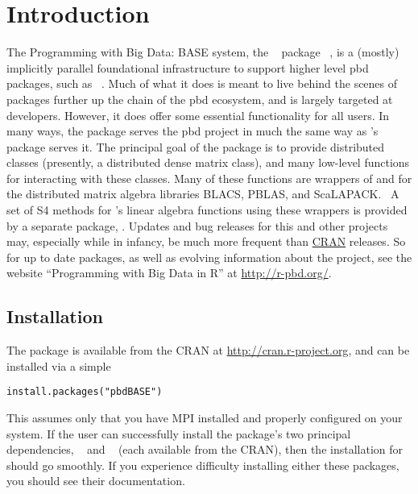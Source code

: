 \section[]{Introduction}
\label{sec:introduction}

The Programming with Big Data:  BASE system, the ~\citep{Rcore} package ~\citep{Schmidt2012pbdBASEpackage}, is a (mostly) implicitly parallel foundational infrastructure to support higher level pbd packages, such as ~\citep{Schmidt2012pbdDMATpackage}.  Much of what it does is meant to live behind the scenes of packages further up the chain of the pbd ecosystem, and is largely targeted at developers.  However, it does offer some essential functionality for all users.
\np
In many ways, the  package serves the pbd project in much the same way as 's  package serves it.  The principal goal of the  package is to provide distributed classes (presently, a distributed dense matrix class), and many low-level functions for interacting with these classes.  Many of these functions are wrappers of and for the distributed matrix algebra libraries BLACS, PBLAS, and ScaLAPACK.~\citep{slug}  A set of S4 methods for 's linear algebra functions using these wrappers is provided by a separate package, .
\np
Updates and bug releases for this and other  projects may, especially while in infancy, be much more frequent than \href{http://cran.r-project.org/}{CRAN} releases.  So for up to date packages, as well as evolving information about the  project,  see the website ``Programming with Big Data in R'' at \href{http://r-pbd.org/}{http://r-pbd.org/}.


\subsection[]{Installation}
\label{sec:installation}

The  package is available from the CRAN at
\url{http://cran.r-project.org}, and can be installed via a simple 
\begin{lstlisting}[language=rr,title=Installing pbdBASE]
install.packages("pbdBASE")
\end{lstlisting}
This assumes only that you have MPI installed and properly configured on your system.  If the user can successfully install the package's two principal dependencies, ~\citep{Chen2012pbdMPIpackage} and ~\citep{Chen2012pbdSLAPpackage} (each available from the CRAN), then the installation for  should go smoothly.  If you experience difficulty installing either these packages, you should see their documentation.


